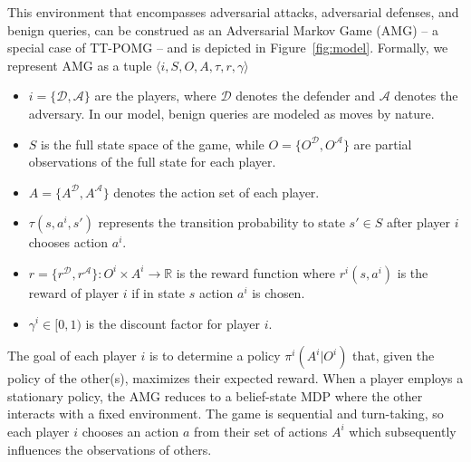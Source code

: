 This environment that encompasses adversarial attacks, adversarial defenses, and benign queries, can be construed as an Adversarial Markov Game (AMG) -- a special case of TT-POMG -- and is depicted in Figure~\ref{fig:model}.
Formally, we represent AMG as a tuple $\langle i, S, O, A, \tau, r, \gamma \rangle$
\begin{itemize}
    \item $i = \{\mathcal{D}, \mathcal{A}\}$ are the players, where $\mathcal{D}$ denotes the defender and $\mathcal{A}$ denotes the adversary. In our model, benign queries are modeled as moves by nature.
    \item $S$ is the full state space of the game, while $O = \{O^{\mathcal{D}}, O^{\mathcal{A}}\}$ are partial observations of the full state for each player.
    \item $A = \{A^{\mathcal{D}}, A^{\mathcal{A}}\}$ denotes the action set of each player.
    \item $\tau(s,a^{i},s')$ represents the transition probability to state $s' \in S$ after player $i$ chooses action $a^i$.
    \item $r = \{r^{\mathcal{D}}, r^{\mathcal{A}}\} : O^i \times A^i \rightarrow \mathbb{R}$ is the reward function where $r^i(s, a^i)$ is the reward of player $i$ if in state $s$ action $a^i$ is chosen.
    \item $\gamma^i \in [0,1)$ is the discount factor for player $i$.
\end{itemize}

The goal of each player $i$ is to determine a policy $\pi^{i}(A^i | O^i)$ that, given the policy of the other(s), maximizes their expected reward.
When a player employs a stationary policy, the AMG reduces to a belief-state MDP where the other interacts with a fixed environment.
The game is sequential and turn-taking, so each player $i$ chooses an action $a$ from their set of actions $A^i$ which subsequently influences the observations of others.

